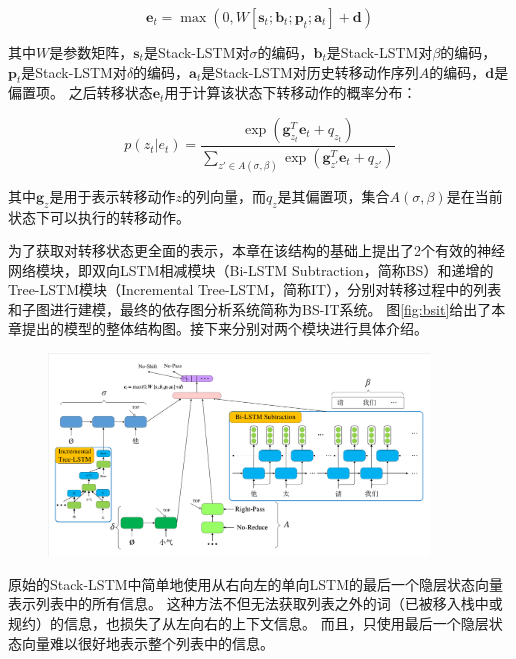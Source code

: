 \vspace{-0.6em}
\begin{equation}
	\label{eq:trans}
	\bm{e}_t=\max(0,W[\bm{s}_t;\bm{b}_t; \bm{p}_t; \bm{a}_t ]+\bm{d})
\end{equation}

其中$W$是参数矩阵，$\bm{s}_t$是Stack-LSTM对$\sigma$的编码，$\bm{b}_t$是Stack-LSTM对$\beta$的编码， $\bm{p}_t$是Stack-LSTM对$\delta$的编码，$\bm{a}_t$是Stack-LSTM对历史转移动作序列$A$的编码，$\bm{d}$是偏置项。
之后转移状态$\bm{e}_t$用于计算该状态下转移动作的概率分布：

\vspace{-0.6em}
\begin{equation}
	\label{eq:trans-softmax}
	p(z_t|e_t)=\frac{\exp(\bm{g}^T_{z_t}\bm{e}_t + q_{z_t})}{\sum_{z'\in A(\sigma, \beta)}\exp (\bm{g}^T_{z'}\bm{e}_t+q_{z'})}
\end{equation}

其中$\bm{g}_z$是用于表示转移动作$z$的列向量，而$q_z$是其偏置项，集合$A(\sigma,\beta)$是在当前状态下可以执行的转移动作。

为了获取对转移状态更全面的表示，本章在该结构的基础上提出了2个有效的神经网络模块，即双向LSTM相减模块（Bi-LSTM Subtraction，简称BS）和递增的Tree-LSTM模块（Incremental Tree-LSTM，简称IT），分别对转移过程中的列表和子图进行建模，最终的依存图分析系统简称为BS-IT系统。
图\ref{fig:bsit}给出了本章提出的模型的整体结构图。接下来分别对两个模块进行具体介绍。

\begin{figure}[hbtp]
	\centering
	\includegraphics[width=0.9\textwidth]{figures/bs-it.pdf}
\end{figure}

原始的Stack-LSTM中简单地使用从右向左的单向LSTM的最后一个隐层状态向量表示列表中的所有信息。
这种方法不但无法获取列表之外的词（已被移入栈中或规约）的信息，也损失了从左向右的上下文信息。
而且，只使用最后一个隐层状态向量难以很好地表示整个列表中的信息。

